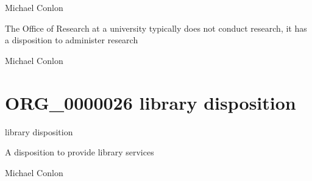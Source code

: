 \documentclass[letterpaper,10pt,english]{sphinxmanual}
\begin{document}
\begin{sphinxShadowBox}

\sphinxAtStartPar
Michael Conlon 
\end{sphinxShadowBox}

\begin{sphinxShadowBox}

\sphinxAtStartPar
The Office of Research at a university typically does not conduct research, it has a disposition to administer research
\end{sphinxShadowBox}

\begin{sphinxShadowBox}

\sphinxAtStartPar
Michael Conlon 
\end{sphinxShadowBox}
\begin{quote}
\label{\detokenize{doc-ORG_0000026:org-0000026}}\label{\detokenize{doc-ORG_0000026:library-disposition}}\label{\detokenize{doc-ORG_0000026:org-0000026}}
\ignorespaces \end{quote}


\section{ORG\_0000026 \sphinxhyphen{} library disposition}
\label{\detokenize{doc-ORG_0000026:org-0000026-library-disposition}}\label{\detokenize{doc-ORG_0000026:index-0}}\label{\detokenize{doc-ORG_0000026::doc}}
\begin{sphinxShadowBox}

\sphinxAtStartPar
library disposition
\end{sphinxShadowBox}

\begin{sphinxShadowBox}

\sphinxAtStartPar
A disposition to provide library services
\end{sphinxShadowBox}

\begin{sphinxShadowBox}

\sphinxAtStartPar
Michael Conlon 
\end{sphinxShadowBox}
\end{document}
